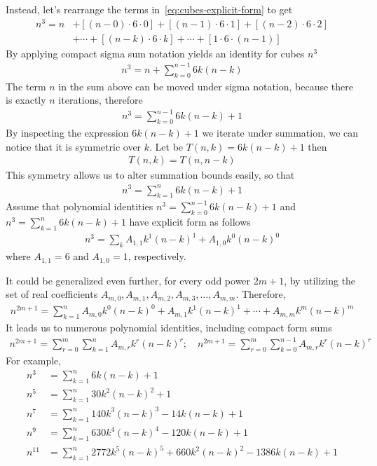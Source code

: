 Instead, let's rearrange the terms in~\eqref{eq:cubes-explicit-form} to get
\begin{align}
    \label{eq:rearrange}
    n^3 = n &+ [(n-0) \cdot 6 \cdot 0] + [(n-1)\cdot6\cdot1] + [(n-2)\cdot6\cdot2] \\
    &+ \cdots + [(n-k)\cdot 6 \cdot k] + \cdots + [1\cdot6\cdot(n-1)] \nonumber
\end{align}
By applying compact sigma sum notation yields an identity for cubes $n^3$
\begin{align*}
    n^3 = n + \sum_{k=0}^{n-1} 6k(n-k)
\end{align*}
The term $n$ in the sum above can be moved under sigma notation, because there is exactly $n$ iterations, therefore
\begin{align}
    \label{eq:cubes-sigma-notation}
    n^3 = \sum_{k=0}^{n-1} 6k(n-k) + 1
\end{align}
By inspecting the expression $6k(n-k) + 1$ we iterate under summation,
we can notice that it is symmetric over $k$.
Let be $T(n,k) = 6k(n-k) + 1$ then
\begin{align*}
    T(n,k) = T(n,n-k)
\end{align*}
This symmetry allows us to alter summation bounds easily, so that
\begin{align}
    \label{eq:cubes-sigma-alter-summation-bounds}
    n^3 = \sum_{k=1}^{n} 6k(n-k) + 1
\end{align}
Assume that polynomial identities
$n^3 = \sum_{k=0}^{n-1} 6k(n-k) + 1$ and $n^3 = \sum_{k=1}^{n} 6k(n-k) + 1$
have explicit form as follows
\begin{align*}
    n^3 = \sum_{k} A_{1,1} k^1(n-k)^1 + A_{1,0} k^0(n-k)^0
\end{align*}
where $A_{1,1} = 6$ and $A_{1,0} = 1$, respectively.

It could be generalized even further, for every odd power $2m+1$, by utilizing the set of real coefficients
$A_{m,0}, A_{m,1},A_{m,2},A_{m,3}, \ldots, A_{m,m}$.
Therefore,
\begin{align}
    \label{eq:odd-power-generalized}
    n^{2m+1} = \sum_{k=1}^{n} A_{m,0} k^0 (n-k)^0 + A_{m,1} k^1 (n-k)^1
    + \cdots + A_{m,m} k^m (n-k)^m
\end{align}
It leads us to numerous polynomial identities, including compact form sums
\begin{align*}
    n^{2m+1} = \sum_{r=0}^{m} \sum_{k=1}^{n} A_{m,r} k^r (n-k)^r; \quad n^{2m+1} = \sum_{r=0}^{m} \sum_{k=0}^{n-1} A_{m,r} k^r (n-k)^r
\end{align*}
For example,
\begin{align*}
    n^3 &= \sum_{k=1}^{n} 6k(n-k) + 1 \\
    n^5 &= \sum_{k=1}^{n} 30k^2(n-k)^2 + 1 \\
    n^7 &= \sum_{k=1}^{n} 140 k^3 (n-k)^3 - 14k(n-k) + 1 \\
    n^9 &= \sum_{k=1}^{n} 630 k^4(n-k)^4 - 120k(n-k) + 1 \\
    n^{11} &= \sum_{k=1}^{n} 2772 k^5(n-k)^5 + 660 k^2(n-k)^2 - 1386k(n-k) + 1
\end{align*}

